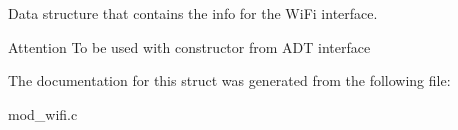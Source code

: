 Data structure that contains the info for the Wi\+Fi interface. 

\begin{DoxyAttention}{Attention}
To be used with constructor from A\+DT interface 
\end{DoxyAttention}


The documentation for this struct was generated from the following file\+:\begin{DoxyCompactItemize}
\item 
mod\+\_\+wifi.\+c\end{DoxyCompactItemize}
